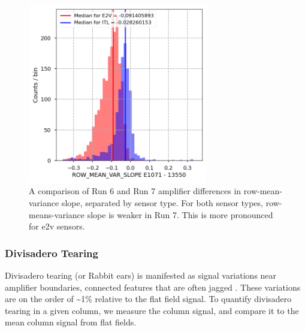 \begin{figure}[H]
\begin{centering}
\includegraphics[width=0.7\textwidth]{figures/baselineCharacterization/ROW_MEAN_VAR_SLOPE_13550_E1071_diff.png}
\caption{A comparison of Run 6 and Run 7 amplifier differences in row-mean-variance slope, separated by sensor type. For both sensor types, row-means-variance slope is weaker in Run 7. This is more pronounced for e2v sensors.}
\end{centering}
\end{figure}

\subsubsection{Divisadero Tearing}

Divisadero tearing (or Rabbit ears) is manifested as signal variations near amplifier boundaries, connected features that are often jagged \cite{2020arXiv200209439J,2024SPIE13103E..0WU}. These variations are on the order of \textasciitilde1\% relative to the flat field signal. To quantify divisadero tearing in a given column, we measure the column signal, and compare it to the mean column signal from flat fields.

